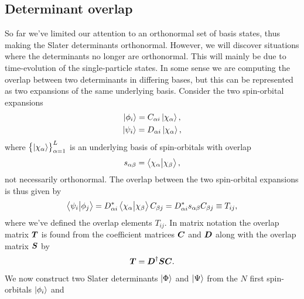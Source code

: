         \subsection{Determinant overlap}
            \label{subsec:determinant-overlap}
            So far we've limited our attention to an orthonormal set of basis
            states, thus making the Slater determinants orthonormal.
            However, we will discover situations where the determinants no
            longer are orthonormal.
            This will mainly be due to time-evolution of the single-particle
            states.
            In some sense we are computing the overlap between two determinants
            in differing bases, but this can be represented as two expansions of
            the same underlying basis.
            Consider the two spin-orbital expansions
            \begin{gather}
                \ket{\phi_i} = C_{\alpha i}\ket{\chi_{\alpha}}, \\
                \ket{\psi_i} = D_{\alpha i}\ket{\chi_{\alpha}},
            \end{gather}
            where $\left\{ \ket{\chi_{\alpha}} \right\}_{\alpha = 1}^{L}$ is an underlying
            basis of spin-orbitals with overlap
            \begin{align}
                s_{\alpha\beta}
                = \braket{\chi_{\alpha}}{\chi_{\beta}},
            \end{align}
            not necessarily orthonormal.
            The overlap between the two spin-orbital expansions is thus given by
            \begin{align}
                \braket{\psi_i}{\phi_j}
                = D^{*}_{\alpha i}
                \braket{\chi_{\alpha}}{\chi_{\beta}}
                C_{\beta j}
                = D^{*}_{\alpha i}
                s_{\alpha\beta}
                C_{\beta j}
                \equiv
                T_{ij},
            \end{align}
            where we've defined the overlap elements $T_{ij}$.
            In matrix notation the overlap matrix $\boldsymbol{T}$ is found from the
            coefficient matrices $\boldsymbol{C}$ and $\boldsymbol{D}$ along with the overlap
            matrix $\boldsymbol{S}$ by
            \begin{align}
                \boldsymbol{T} = \boldsymbol{D}^{\dagger}\boldsymbol{S}\boldsymbol{C}.
            \end{align}
            We now construct two Slater determinants $\ket{\Phi}$ and
            $\ket{\Psi}$ from the $N$ first spin-orbitals $\ket{\phi_i}$ and
